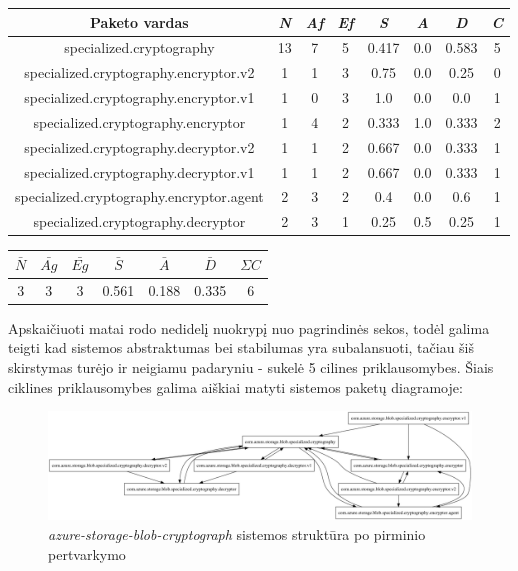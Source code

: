 \begin{center}
    \begin{tabular}{|c|c|c|c|c|c|c|c|}
        \hline
        Paketo vardas & \textit{N} & \textit{Af} & \textit{Ef} & \textit{S} & \textit{A} & \textit{D} & \textit{C} \\ [0.5ex]
        \hline\hline
        specialized.cryptography & 13 & 7 & 5 & 0.417 & 0.0 & 0.583 & 5 \\
        \hline
        specialized.cryptography.encryptor.v2 & 1 & 1 & 3 & 0.75 & 0.0 & 0.25 & 0 \\
        \hline
        specialized.cryptography.encryptor.v1 & 1 & 0 & 3 & 1.0 & 0.0 & 0.0 & 1 \\
        \hline
        specialized.cryptography.encryptor & 1 & 4 & 2 & 0.333 & 1.0 & 0.333 & 2 \\
        \hline
        specialized.cryptography.decryptor.v2 & 1 & 1 & 2 & 0.667 & 0.0 & 0.333 & 1 \\
        \hline
        specialized.cryptography.decryptor.v1 & 1 & 1 & 2 & 0.667 & 0.0 & 0.333 & 1\\
        \hline
        specialized.cryptography.encryptor.agent & 2 & 3 & 2 & 0.4 & 0.0 & 0.6 & 1\\
        \hline
        specialized.cryptography.decryptor & 2 & 3 & 1 & 0.25 & 0.5 & 0.25 & 1 \\
        \hline
    \end{tabular}
    \begin{tabular}{|c|c|c|c|c|c|c|}
        \hline
        $\bar{N}$ & $\bar{Ag}$ & $\bar{Eg}$ & $\bar{S}$ & $\bar{A}$ & $\bar{D}$ & $\Sigma C$ \\ [0.5ex]
        \hline\hline
        3 & 3 & 3 & 0.561 & 0.188 & \cellcolor{green!25} 0.335 & \cellcolor{red!25} 6 \\
        \hline
    \end{tabular}
\end{center}
Apskaičiuoti matai rodo nedidelį nuokrypį nuo pagrindinės sekos, todėl galima teigti kad sistemos abstraktumas bei stabilumas
yra subalansuoti, tačiau šiš skirstymas turėjo ir neigiamu padaryniu - sukelė 5 cilines priklausomybes.
Šiais ciklines priklausomybes galima aiškiai matyti sistemos paketų diagramoje:
\begin{figure}[H]
    \centering
    \includegraphics[scale=0.3]{img/azure_packages_v1}
    \caption{\textit{azure-storage-blob-cryptograph} sistemos struktūra po pirminio pertvarkymo}
    \label{img:azure_packages_v1}
\end{figure}
